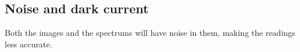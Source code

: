 
\subsection{Noise and dark current}
Both the images and the spectrums will have noise in them, making the readings less accurate. 

% 